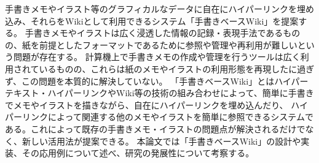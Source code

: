 


\begin{jabstract}


 手書きメモやイラスト等のグラフィカルなデータに自在にハイパーリンクを埋め込み、それらをWikiとして利用できるシステム「手書きベースWiki」を提案する。
 手書きメモやイラストは広く浸透した情報の記録・表現手法であるものの、紙を前提としたフォーマットであるために参照や管理や再利用が難しいという問題が存在する。
 計算機上で手書きメモの作成や管理を行うツールは広く利用されているものの、これらは紙のメモやイラストの利用形態を再現したに過ぎず、この問題を本質的に解決していない。
 「手書きベースWiki」とはハイパーテキスト・ハイパーリンクやWiki等の技術の組み合わせによって、簡単に手書きでメモやイラストを描きながら、自在にハイパーリンクを埋め込んだり、
 ハイパーリンクによって関連する他のメモやイラストを簡単に参照できるシステムである。これによって既存の手書きメモ・イラストの問題点が解決されるだけでなく、新しい活用法が提案できる。
 本論文では「手書きベースWiki」の設計や実装、その応用例について述べ、研究の発展性について考察する。

\end{jabstract}



